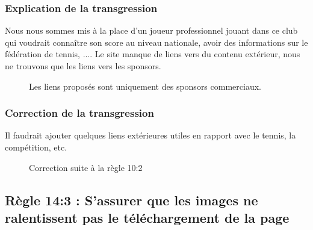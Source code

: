 \documentclass{article}[12pt]
\begin{document}
    \subsubsection*{Explication de la transgression}
    Nous nous sommes mis à la place d'un joueur professionnel jouant dans ce club qui voudrait connaître son score au niveau nationale, avoir des informations sur le fédération de tennis, .... Le site manque de liens vers du contenu extérieur, nous ne trouvons que les liens vers les sponsors.
        \begin{figure}[H]
        	\centering
        	\caption{Les liens proposés sont uniquement des sponsors commerciaux.}
        \end{figure}
    
    \subsubsection*{Correction de la transgression}
    Il faudrait ajouter quelques liens extérieures utiles en rapport avec le tennis, la compétition, etc.
        \begin{figure}[H]
        	\centering
        	\caption{Correction suite à la règle 10:2}
        \end{figure}
   \newpage
    \subsection{Règle 14:3 : S'assurer que les images ne ralentissent pas le téléchargement de la page}
\end{document}
